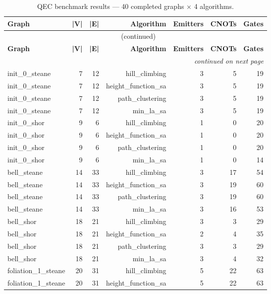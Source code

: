 \begin{longtable}{lrrrrrr}
  \caption{QEC benchmark results — 40 completed graphs × 4 algorithms.} \label{tab:qec_results} \\
  \toprule
  \textbf{Graph} & \textbf{|V|} & \textbf{|E|} & \textbf{Algorithm} & \textbf{Emitters} & \textbf{CNOTs} & \textbf{Gates} \\
  \midrule
  \endfirsthead
  \multicolumn{7}{c}{\tablename\ \thetable{} (continued)} \\
  \toprule
  \textbf{Graph} & \textbf{|V|} & \textbf{|E|} & \textbf{Algorithm} & \textbf{Emitters} & \textbf{CNOTs} & \textbf{Gates} \\
  \midrule
  \endhead
  \midrule \multicolumn{7}{r}{\textit{continued on next page}} \\
  \endfoot
  \bottomrule
  \endlastfoot
  init\_0\_steane & 7 & 12 & hill\_climbing & 3 & 5 & 19 \\
  init\_0\_steane & 7 & 12 & height\_function\_sa & 3 & 5 & 19 \\
  init\_0\_steane & 7 & 12 & path\_clustering & 3 & 5 & 19 \\
  init\_0\_steane & 7 & 12 & min\_la\_sa & 3 & 5 & 19 \\
  init\_0\_shor & 9 & 6 & hill\_climbing & 1 & 0 & 20 \\
  init\_0\_shor & 9 & 6 & height\_function\_sa & 1 & 0 & 20 \\
  init\_0\_shor & 9 & 6 & path\_clustering & 1 & 0 & 20 \\
  init\_0\_shor & 9 & 6 & min\_la\_sa & 1 & 0 & 14 \\
  bell\_steane & 14 & 33 & hill\_climbing & 3 & 17 & 54 \\
  bell\_steane & 14 & 33 & height\_function\_sa & 3 & 19 & 60 \\
  bell\_steane & 14 & 33 & path\_clustering & 3 & 19 & 60 \\
  bell\_steane & 14 & 33 & min\_la\_sa & 3 & 16 & 53 \\
  bell\_shor & 18 & 21 & hill\_climbing & 3 & 3 & 29 \\
  bell\_shor & 18 & 21 & height\_function\_sa & 2 & 4 & 35 \\
  bell\_shor & 18 & 21 & path\_clustering & 3 & 3 & 29 \\
  bell\_shor & 18 & 21 & min\_la\_sa & 3 & 4 & 32 \\
  foliation\_1\_steane & 20 & 31 & hill\_climbing & 5 & 22 & 63 \\
  foliation\_1\_steane & 20 & 31 & height\_function\_sa & 5 & 22 & 63 \\

\end{longtable}
